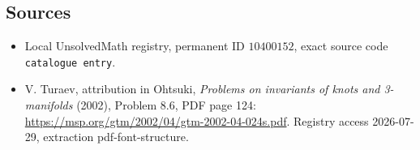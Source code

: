 \documentclass[11pt]{article}
\begin{document}
\subsection{Sources}
\begin{itemize}
\item Local UnsolvedMath registry, permanent ID \(10400152\), exact source code \texttt{catalogue entry}.
\item V. Turaev, attribution in Ohtsuki, \emph{Problems on invariants of knots and 3-manifolds} (2002), Problem 8.6, PDF page 124: \url{https://msp.org/gtm/2002/04/gtm-2002-04-024s.pdf}. Registry access 2026-07-29, extraction pdf-font-structure.
\end{itemize}
\end{document}
